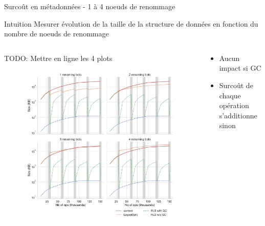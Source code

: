 \begin{frame}{Surcoût en métadonnées - 1 à 4 noeuds de renommage}
  \begin{block}{Intuition}
    Mesurer évolution de la taille de la structure de données \alert{en fonction du nombre de noeuds de renommage}
  \end{block}
  \begin{columns}
    \begin{column}{0.6 \textwidth}
        TODO: Mettre en ligne les 4 plots
        \begin{figure}
            \centering
            \includegraphics[width=\columnwidth]{img/2022-10-27-snapshot-sizes.pdf}
        \end{figure}
    \end{column}
    \begin{column}{0.4 \textwidth}
        \begin{itemize}
            \item Aucun impact si GC
            \item Surcoût de chaque opération \ren s'additionne sinon
          \end{itemize}
    \end{column}
  \end{columns}
\end{frame}

